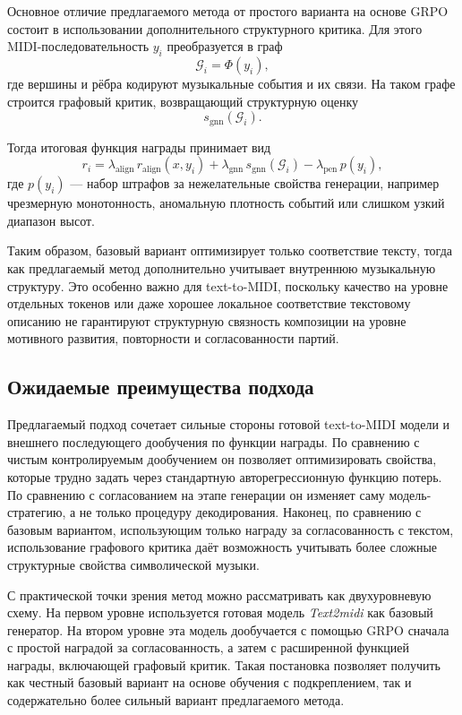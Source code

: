 \documentclass[a4paper,12pt]{extarticle}
\begin{document}
Основное отличие предлагаемого метода от простого варианта на основе GRPO
состоит в использовании дополнительного структурного критика. Для этого
MIDI-последовательность $y_i$ преобразуется в граф
$$
\mathcal{G}_i = \Phi(y_i),
$$
где вершины и рёбра кодируют музыкальные события и их связи. На таком
графе строится графовый критик, возвращающий структурную оценку
$$
s_{\mathrm{gnn}}(\mathcal{G}_i).
$$

Тогда итоговая функция награды принимает вид
$$
r_i =
\lambda_{\mathrm{align}}\, r_{\mathrm{align}}(x, y_i)
+
\lambda_{\mathrm{gnn}}\, s_{\mathrm{gnn}}(\mathcal{G}_i)
-
\lambda_{\mathrm{pen}}\, p(y_i),
$$
где $p(y_i)$ --- набор штрафов за нежелательные свойства генерации,
например чрезмерную монотонность, аномальную плотность событий или
слишком узкий диапазон высот.

Таким образом, базовый вариант оптимизирует только соответствие тексту,
тогда как предлагаемый метод дополнительно учитывает внутреннюю
музыкальную структуру. Это особенно важно для text-to-MIDI, поскольку
качество на уровне отдельных токенов или даже хорошее локальное
соответствие текстовому описанию не гарантируют структурную связность
композиции на уровне мотивного развития, повторности и согласованности
партий.

\subsection{Ожидаемые преимущества подхода}

Предлагаемый подход сочетает сильные стороны готовой text-to-MIDI модели
и внешнего последующего дообучения по функции награды. По сравнению с
чистым контролируемым дообучением он позволяет оптимизировать свойства,
которые трудно задать через стандартную авторегрессионную функцию
потерь. По сравнению с согласованием на этапе генерации он изменяет саму
модель-стратегию, а не только процедуру декодирования. Наконец, по
сравнению с базовым вариантом, использующим только награду за
согласованность с текстом, использование графового критика даёт
возможность учитывать более сложные структурные свойства символической
музыки.

С практической точки зрения метод можно рассматривать как двухуровневую
схему. На первом уровне используется готовая модель \textit{Text2midi}
как базовый генератор. На втором уровне эта модель дообучается с помощью
GRPO сначала с простой наградой за согласованность, а затем с
расширенной функцией награды, включающей графовый критик. Такая
постановка позволяет получить как честный базовый вариант на основе
обучения с подкреплением, так и содержательно более сильный вариант
предлагаемого метода.
\newpage 
\printbibliography[heading=bibintoc] 
\end{document}
